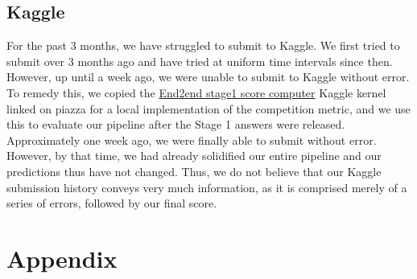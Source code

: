 \documentclass[paper=letter, fontsize=12pt]{article}
\newcommand\includeappendices{%
  \appendix
  \renewcommand{\thesection}{\Alph{section}}
  \section{Appendix}
  \the\mainnotetoks}
\numberwithin{equation}{section} %
\numberwithin{figure}{section} %
\numberwithin{table}{section} %
\begin{document}
\subsection{ Kaggle }

For the past 3 months, we have struggled to submit to Kaggle. We first tried to
submit over 3 months ago and have tried at uniform time intervals since then.
However, up until a week ago, we were unable to submit to Kaggle without error.
To remedy this, we copied the
\href{https://www.kaggle.com/zhujf553/end2end-stage1-score-computer/notebook}
{End2end stage1 score computer} Kaggle kernel linked on piazza for a local
implementation of the competition metric, and we use this to evaluate our
pipeline after the Stage 1 answers were released. Approximately one week ago,
we were finally able to submit without error. However, by that time, we had
already solidified our entire pipeline and our predictions thus have not
changed.  Thus, we do not believe that our Kaggle submission history conveys
very much information, as it is comprised merely of a series of errors,
followed by our final score.

\newpage

\printbibliography

\newpage

\includeappendices
\end{document}
